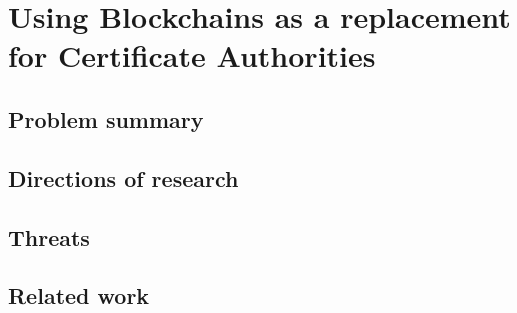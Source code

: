 \section{Using Blockchains as a replacement for Certificate Authorities}

\subsection{Problem summary}
\subsection{Directions of research}
\subsection{Threats}
\subsection{Related work}

